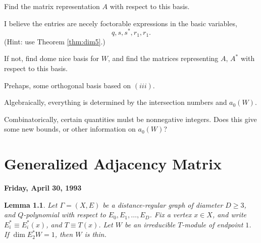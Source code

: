 \documentclass[
]{book}
\newtheorem{lemma}{Lemma}[chapter]
\theoremstyle{definition}
\theoremstyle{definition}
\theoremstyle{definition}
\theoremstyle{definition}
\theoremstyle{remark}
\begin{document}
Find the matrix representation \(A\) with respect to this basis.

I believe the entries are necely foctorable expressions in the basic variables,
\[q, s, s^*, r_1, r_1.\]
(Hint: use Theorem \ref{thm:dim5}.)

If not, find dome nice basis for \(W\), and find the matrices representing \(A\), \(A^*\) with respect to this basis.

Prehaps, some orthogonal basis based on \((iii)\).

Algebraically, everything is determined by the intersection numbers and \(a_0(W)\).

Combinatorically, certain quantities mulst be nonnegative integers. Does this give some new bounds, or other information on \(a_0(W)\)?

\hypertarget{lec37}{%
\chapter{Generalized Adjacency Matrix}\label{lec37}}

\textbf{Friday, April 30, 1993}

\begin{lemma}
\protect\hypertarget{lem:1-thin-condition}{}\label{lem:1-thin-condition}Let \(\Gamma = (X, E)\) be a distance-regular graph of diameter \(D\geq 3\), and \(Q\)-polynomial with respect to \(E_0, E_1, \ldots, E_D\).
Fix a vertex \(x\in X\), and write \(E^*_i\equiv E^*_i(x)\), and \(T\equiv T(x)\). Let \(W\) be an irreducible \(T\)-module of endpoint \(1\). If \(\dim E^*_2W = 1\), then \(W\) is thin.
\end{lemma}
\end{document}
